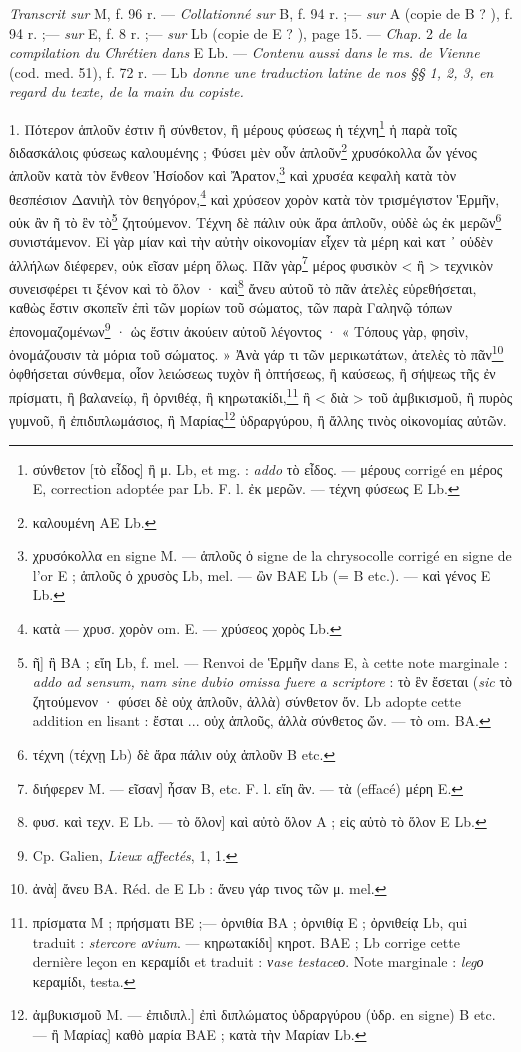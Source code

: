 \documentclass[a4paper, 11pt, oneside, polutonikogreek, french]{article}
\begin{document}
\emph{Transcrit sur} M, f. 96 r. --- \emph{Collationné sur} B, f. 94 r. ;--- \emph{sur} A (copie de B ? ), f. 94 r. ;--- \emph{sur} E, f. 8 r. ;--- \emph{sur} Lb (copie de E ? ), page 15. --- \emph{Chap.} 2 \emph{de la compilation du Chrétien dans} E Lb. --- \emph{Contenu aussi dans le ms. de Vienne} (cod. med. 51), f. 72 r. --- Lb \emph{donne une traduction latine de nos §§ 1, 2, 3, en regard du texte, de la main du copiste.}

\bigskip

1. Πότερον ἁπλοῦν ἐστιν ἢ σύνθετον, ἢ μέρους φύσεως ἡ τέχνη\footnote{σύνθετον [τὸ εἶδος] ἢ μ. Lb, et mg. : \emph{addo} τὸ εἶδος. --- μέρους corrigé en μέρος E, correction adoptée par Lb. F. l. ἐκ μερῶν. --- τέχνη φύσεως E Lb.} ἡ παρὰ τοῖς διδασκάλοις φύσεως καλουμένης ; Φύσει μὲν οὖν ἁπλοῦν\footnote{καλουμένη AE Lb.} χρυσόκολλα ὦν γένος ἀπλοῦν κατὰ τὸν ἔνθεον Ἡσίοδον καὶ Ἄρατον,\footnote{χρυσόκολλα en signe M. --- ἁπλοῦς ὁ signe de la chrysocolle corrigé en signe de l'or E ; ἁπλοῦς ὁ χρυσὸς Lb, mel. --- ὢν BAE Lb (= B etc.). --- καὶ γένος E Lb.} καὶ χρυσέα κεφαλὴ κατὰ τὸν θεσπέσιον Δανιὴλ τὸν θεηγόρον,\footnote{κατὰ --- χρυσ. χορὸν om. E. --- χρύσεος χορὸς Lb.} καὶ χρύσεον χορὸν κατὰ τὸν τρισμέγιστον Ἑρμῆν, οὐκ ἂν ῆ τὸ ἓν τὸ\footnote{ῆ] ἢ BA ; εἴη Lb, f. mel. --- Renvoi de Ἑρμῆν dans E, à cette note marginale : \emph{addo ad sensum, nam sine dubio omissa fuere a scriptore} : τὸ ἓν ἔσεται (\emph{sic} τὸ ζητούμενον · φύσει δὲ οὐχ ἁπλοῦν, ἀλλὰ) σύνθετον ὄν. Lb adopte cette addition en lisant : ἔσται ... οὐχ ἁπλοῦς, ἀλλὰ σύνθετος ὤν. --- τὸ om. BA.} ζητούμενον. Τέχνη δὲ πάλιν οὐκ ἄρα ἁπλοῦν, οὐδὲ ὡς ἐκ μερῶν\footnote{τέχνη (τέχνῃ Lb) δὲ ἄρα πάλιν οὐχ ἁπλοῦν B etc.} συνιστάμενον. Εἰ γὰρ μίαν καὶ τὴν αὐτὴν οἰκονομίαν εἶχεν τὰ μέρη καὶ κατ ᾽ οὐδὲν ἀλλήλων διέφερεν, οὐκ εῖσαν μέρη ὅλως. Πᾶν γὰρ\footnote{διήφερεν M. --- εῖσαν] ἦσαν B, etc. F. l. εἴη ἂν. --- τὰ (effacé) μέρη E.} μέρος φυσικὸν < ἢ > τεχνικὸν συνεισφέρει τι ξένον καὶ τὸ ὅλον · καὶ\footnote{φυσ. καὶ τεχν. E Lb. --- τὸ ὅλον] καὶ αὐτὸ ὅλον A ; εἰς αὐτὸ τὸ ὅλον E Lb.} ἄνευ αὐτοῦ τὸ πᾶν ἀτελὲς εὑρεθήσεται, καθὼς ἔστιν σκοπεῖν ἐπὶ τῶν μορίων τοῦ σώματος, τῶν παρὰ Γαληνῷ τόπων ἐπονομαζομένων\footnote{Cp. Galien, \emph{Lieux affectés}, 1, 1.} · ὡς ἔστιν ἀκούειν αὐτοῦ λέγοντος · « Τόπους γὰρ, φησὶν, ὀνομάζουσιν τὰ μόρια τοῦ σώματος. » Ἀνὰ γάρ τι τῶν μερικωτάτων, ἀτελὲς τὸ πᾶν\footnote{ἀνὰ] ἄνευ BA. Réd. de E Lb : ἄνευ γάρ τινος τῶν μ. mel.} ὀφθήσεται σύνθεμα, οἷον λειώσεως τυχὸν ἢ ὀπτήσεως, ἢ καύσεως, ἢ σήψεως τῆς ἐν πρίσματι, ἢ βαλανείῳ, ἢ ὀρνιθέᾳ, ἢ κηρωτακίδι,\footnote{πρίσματα M ; πρήσματι BE ;--- ὀρνιθία BA ; ὀρνιθίᾳ E ; ὀρνιθείᾳ Lb, qui traduit : \emph{stercore aνium}. --- κηρωτακίδι] κηροτ. BAE ; Lb corrige cette dernière leçon en κεραμίδι et traduit : \emph{νase testaceο}. Note marginale : \emph{legο} κεραμίδι, testa.} ἢ < διὰ > τοῦ ἀμβικισμοῦ, ἢ πυρὸς γυμνοῦ, ἢ ἐπιδιπλωμάσιος, ἢ Μαρίας\footnote{ἀμβυκισμοῦ M. --- ἐπιδιπλ.] ἐπὶ διπλώματος ὑδραργύρου (ὑδρ. en signe) B etc. --- ἢ Μαρίας] καθὸ μαρία BAE ; κατὰ τὴν Mαρίαν Lb.} ὑδραργύρου, ἢ ἄλλης τινὸς οἰκονομίας αὐτῶν.
\end{document}
